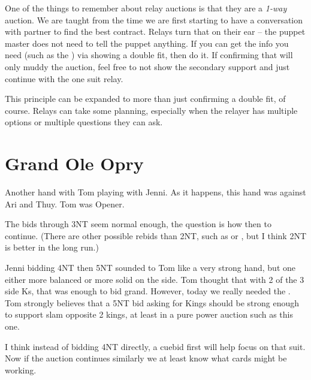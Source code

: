 \documentclass[tom-ari]{subfile}
\begin{document}
	One of the things to remember about relay auctions is that they are a \emph{1-way} auction. We are taught from the time we are first starting to have a conversation with partner to find the best contract. Relays turn that on their ear -- the puppet master does not need to tell the puppet anything.  If you can get the info you need (such as the ) via showing a double fit, then do it.  If confirming that will only muddy the auction, feel free to not show the secondary support and just continue with the one suit relay.
	
	This principle can be expanded to more than just confirming a double fit, of course. Relays can take some planning, especially when the relayer has multiple options or multiple questions they can ask.
	
	\section{Grand Ole Opry}
	 
	
	Another hand with Tom playing with Jenni. As it happens, this hand was against Ari and Thuy. Tom was Opener.
	
	The bids through 3NT seem normal enough, the question is how then to continue.  (There are other possible rebids than 2NT, such as  or , but I think 2NT is better in the long run.)
	
	Jenni bidding 4NT then 5NT sounded to Tom like a very strong hand, but one either more balanced or more solid on the side. Tom thought that with 2 of the 3 side Ks, that was enough to bid grand.  However, today we really needed the . Tom strongly believes that a 5NT bid asking for Kings should be strong enough to support slam opposite 2 kings, at least in a pure power auction such as this one.
	
	I think instead of bidding 4NT directly, a  cuebid first will help focus on that suit.  Now if the auction continues similarly we at least know what cards might be working.

\end{document}
